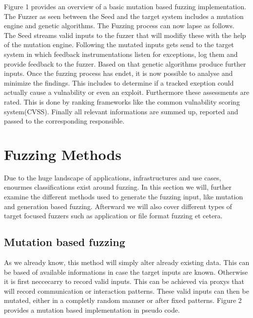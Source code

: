 \documentclass[journal=tosc,final]{iacrtrans}
\begin{document}
\noindent Figure 1 provides an overview of a basic mutation based fuzzing implementation. The Fuzzer as seen between the Seed and the target system includes a mutation engine and genetic algorithms. The Fuzzing process can now lapse as follows.\\
The Seed streams valid inputs to the fuzzer that will modifiy these with the help of the mutation engine. Following the mutated inputs gets send to the target system in which feedback instrumentations listen for exceptions, log them and provide feedback to the fuzzer. Based on that genetic algorithms produce further inputs. Once the fuzzing process has endet, it is now possible to analyse and minimize the findings. This includes to determine if a tracked exeption could actually cause a vulnability or even an exploit. Furthermore these assessments are rated. This is done by ranking frameworks like the common vulnability scoring system(CVSS). Finally all relevant informations are summed up, reported and passed to the corresponding responsible. 


\section{Fuzzing Methods}
Due to the huge landscape of applications, infrastructures and use cases, enourmes classifications exist around fuzzing. In this section we will, further examine the different methods used to generate the fuzzing input, like mutation and generation based fuzzing. Afterward we will also cover different types of target focused fuzzers such as application or file format fuzzing et cetera. 
\subsection{Mutation based fuzzing}
As we already know, this method will simply alter already existing data. This can be based of available informations in case the target inputs are known. Otherwise it is first neccecarry to record valid inputs. This can be achieved via proxys that will record communication or interaction patterns. These valid inputs can then be mutated, either in a completly random manner or after fixed patterns. Figure 2 provides a mutation based implementation in pseudo code. 
\end{document}
